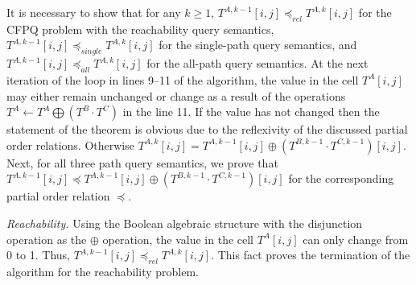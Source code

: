 It is necessary to show that for any $k \geq 1$, $T^{A, k - 1}[i, j] \preceq_{\textit{rel}} T^{A, k}[i, j]$ for the CFPQ problem with the reachability query semantics, $T^{A, k - 1}[i, j] \preceq_{\textit{single}} T^{A, k}[i, j]$ for the single-path query semantics, and $T^{A, k - 1}[i, j] \preceq_{\textit{all}} T^{A, k}[i, j]$ for the all-path query semantics. At the next iteration of the loop in lines 9--11 of the algorithm, the value in the cell $T^A[i, j]$ may either remain unchanged or change as a result of the operations $T^{A} \gets T^{A} \bigoplus (T^{B} \cdot T^{C})$ in the line 11. If the value has not changed then the statement of the theorem is obvious due to the reflexivity of the discussed partial order relations. Otherwise $T^{A, k}[i, j] = T^{A, k - 1}[i, j] \oplus (T^{B, k - 1} \cdot T^{C, k - 1})[i, j]$. Next, for all three path query semantics, we prove that $T^{A, k - 1}[i, j] \preceq T^{A, k - 1}[i, j] \oplus (T^{B, k - 1} \cdot T^{C, k - 1})[i, j]$ for the corresponding partial order relation $\preceq$.

\textit{Reachability.} %
Using the Boolean algebraic structure with the disjunction operation as the $\oplus$ operation, the value in the cell $T^A[i, j]$ can only change from 0 to 1. Thus, $T^{A, k - 1}[i, j] \preceq_{\textit{rel}} T^{A, k}[i, j]$. This fact proves the termination of the algorithm for the reachability problem.

